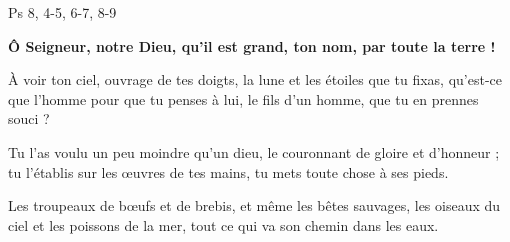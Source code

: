 Ps 8, 4-5, 6-7, 8-9

\textbf{
Ô Seigneur, notre Dieu,
qu’il est grand, ton nom,
par toute la terre !
}

À voir ton ciel, ouvrage de tes doigts,
la lune et les étoiles que tu fixas,
qu’est-ce que l’homme pour que tu penses à lui,
le fils d’un homme, que tu en prennes souci ?

Tu l’as voulu un peu moindre qu’un dieu,
le couronnant de gloire et d’honneur ;
tu l’établis sur les œuvres de tes mains,
tu mets toute chose à ses pieds.

Les troupeaux de bœufs et de brebis,
et même les bêtes sauvages,
les oiseaux du ciel et les poissons de la mer,
tout ce qui va son chemin dans les eaux.
